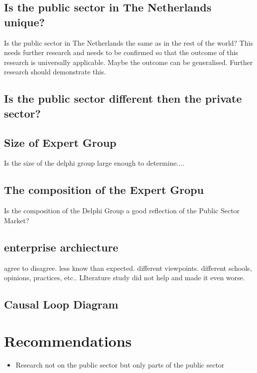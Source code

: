 \subsection{Is the public sector in The Netherlands unique?}
\label{sub:discussionpublicsector}
Is the public sector in The Netherlands the same as in the rest of the world? This needs further research and needs to be confirmed so that the outcome of this research is universally applicable. Maybe the outcome can be generalised. Further research should demonstrate this.

\subsection{Is the public sector different then the private sector?}
\label{sub:discussionpublicvsprivate}


\subsection{Size of Expert Group}
\label{sub:discussionsizeofeg}
Is the size of the delphi group large enough to determine....
\subsection{The composition of the Expert Gropu}
\label{sub:compositionofeg}
Is the composition of the Delphi Group a good reflection of the Public Sector Market?

\subsection{enterprise archiecture}

agree to disagree. less know than expected. different viewpoints. different schools, opinions, practices, etc.. LIterature study did not help and made it even worse.

\subsection{Causal Loop Diagram}

\section{Recommendations}
\label{sec:reccomandations}

\begin{itemize}
	\item{Research not on the public sector but only parts of the public sector}
\end{itemize}